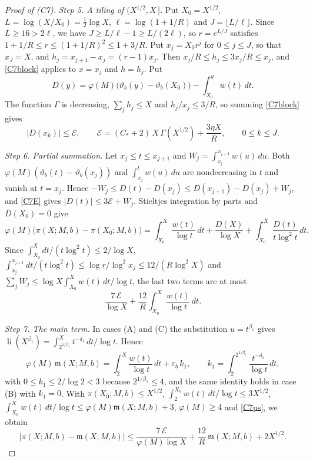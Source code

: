 \begin{proof}[Proof of (C7)]
\emph{Step 5. A tiling of $(X^{1/2},X\,]$.} Put $X_0=X^{1/2}$, $L=\log(X/X_0)=\frac12\log X$, $\ell=\log(1+1/R)$ and $J=\lfloor L/\ell\rfloor$. Since $L\ge16>2\ell$, we have $J\ge L/\ell-1\ge L/(2\ell)$, so $r=e^{L/J}$ satisfies $1+1/R\le r\le(1+1/R)^2\le1+3/R$. Put $x_j=X_0r^j$ for $0\le j\le J$, so that $x_J=X$, and $h_j=x_{j+1}-x_j=(r-1)x_j$. Then $x_j/R\le h_j\le3x_j/R\le x_j$, and \eqref{C7block} applies to $x=x_j$ and $h=h_j$. Put
\[
D(y)=\varphi(M)\big(\vartheta_b(y)-\vartheta_b(X_0)\big)-\int_{X_0}^yw(t)\,dt .
\]
The function $\Gamma$ is decreasing, $\sum_jh_j\le X$ and $h_j/x_j\le3/R$, so summing \eqref{C7block} gives
\begin{equation}\label{C7E}
\lvert D(x_k)\rvert\le\mathcal E,\qquad \mathcal E=(C_\ast+2)\,X\,\Gamma(X^{1/2})+\frac{3\eta X}R,\qquad 0\le k\le J .
\end{equation}

\emph{Step 6. Partial summation.} Let $x_j\le t\le x_{j+1}$ and $W_j=\int_{x_j}^{x_{j+1}}w(u)\,du$. Both $\varphi(M)(\vartheta_b(t)-\vartheta_b(x_j))$ and $\int_{x_j}^tw(u)\,du$ are nondecreasing in $t$ and vanish at $t=x_j$. Hence $-W_j\le D(t)-D(x_j)\le D(x_{j+1})-D(x_j)+W_j$, and \eqref{C7E} gives $\lvert D(t)\rvert\le3\mathcal E+W_j$. Stieltjes integration by parts and $D(X_0)=0$ give
\[
\varphi(M)\big(\pi(X;M,b)-\pi(X_0;M,b)\big)=\int_{X_0}^X\frac{w(t)}{\log t}\,dt+\frac{D(X)}{\log X}+\int_{X_0}^X\frac{D(t)}{t\log^2t}\,dt .
\]
Since $\int_{X_0}^Xdt/(t\log^2t)\le2/\log X$, $\int_{x_j}^{x_{j+1}}dt/(t\log^2t)\le\log r/\log^2x_j\le12/(R\log^2X)$ and $\sum_jW_j\le\log X\int_{X_0}^Xw(t)\,dt/\log t$, the last two terms are at most
\begin{equation}\label{C7ps}
\frac{7\,\mathcal E}{\log X}+\frac{12}R\int_{X_0}^X\frac{w(t)}{\log t}\,dt .
\end{equation}

\emph{Step 7. The main term.} In cases (A) and (C) the substitution $u=t^{\beta_1}$ gives $\operatorname{li}(X^{\beta_1})=\int_{2^{1/\beta_1}}^Xt^{-\delta_1}\,dt/\log t$. Hence
\[
\varphi(M)\,\mathfrak m(X;M,b)=\int_2^X\frac{w(t)}{\log t}\,dt+\varepsilon_b\,k_1,\qquad k_1=\int_2^{2^{1/\beta_1}}\frac{t^{-\delta_1}}{\log t}\,dt ,
\]
with $0\le k_1\le2/\log2<3$ because $2^{1/\beta_1}\le4$, and the same identity holds in case (B) with $k_1=0$. With $\pi(X_0;M,b)\le X^{1/2}$, $\int_2^{X_0}w(t)\,dt/\log t\le3X^{1/2}$, $\int_{X_0}^Xw(t)\,dt/\log t\le\varphi(M)\mathfrak m(X;M,b)+3$, $\varphi(M)\ge4$ and \eqref{C7ps}, we obtain
\begin{equation}\label{C7abs}
\lvert\pi(X;M,b)-\mathfrak m(X;M,b)\rvert\le\frac{7\,\mathcal E}{\varphi(M)\log X}+\frac{12}R\,\mathfrak m(X;M,b)+2X^{1/2}.
\end{equation}


\end{proof}
